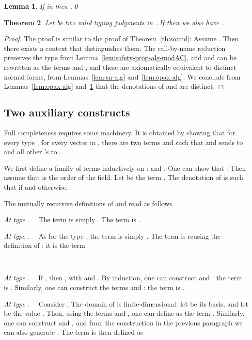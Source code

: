 \documentclass[10pt]{article}
\theoremstyle{plain}
\newtheorem{theorem}{Theorem}
\newtheorem{lemma}[theorem]{Lemma}
\theoremstyle{definition}
\begin{document}
\begin{lemma}
  \label{lem:axdenot-alg}
  If  in  then .\qed
\end{lemma}


\begin{theorem}
  \label{th:sound-alg}
  Let  be two valid typing judgments in
  . If  then we also have
  .
\end{theorem}

\begin{proof}
  The proof is similar to the proof of Theorem~\ref{th:sound}: Assume
  . Then there exists a context  that distinguishes
  them. The call-by-name reduction preserves the type from
  Lemma~\ref{lem:safety-prop-alg-modAC}, and  and  can be rewritten
  as the terms
   and , and these are axiomatically
  equivalent to distinct normal forms, from Lemmas~\ref{lem:sn-alg}
  and~\ref{lem:opax-alg}. We conclude from Lemmas~\ref{lem:opax-alg}
  and~\ref{lem:axdenot-alg} that the
  denotations of  and  are distinct.
\end{proof}

\subsection{Two auxiliary constructs}
\label{sec:aux-constructs}

Full completeness requires some machinery.  It is obtained by
showing that for every type , for every vector  in
, there are two terms  and  such that  and  sends
 to  and all other 's to .


We first define a family of terms 
inductively on :  and 
.
One can show that .
Then assume that  is the
order of the field. Let   be the term 
. The denotation of  is such that  if
 and  otherwise.


The mutually recursive definitions of  and  read as
follows.

\smallskip
\noindent
{\em At type .}~~
The term  is simply .
The term  is 
.

\smallskip
\noindent
{\em At type .}~~
As for the type , the term 
is simply . The term
 is reusing the
definition of : it is the term

.


\smallskip
\noindent
{\em At type }.~~
If
, then , with  and . 
By induction, one can construct  and : the term
 is . Similarly, one can construct the terms
 and : the term  is 
.

\smallskip
\noindent
{\em At type .}~~
Consider
. The domain of 
is finite-dimensional: let  be its basis, and let 
be the value . Then, using the terms  and
, one can define  as the term
.
Similarly, one can construct  and , and from
the construction in the previous paragraph we can also generate
. The term
 is then defined as
\end{document}
